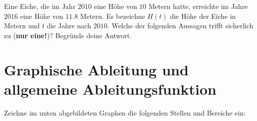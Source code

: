 \documentclass[11pt]{exam}
\begin{document}
\begin{questions}

\question[4] %
Eine Eiche, die im Jahr  $2010$ eine Höhe von $10$ Metern hatte, erreichte im Jahre $2016$ eine Höhe von $11.8$ Metern. Es bezeichne $H(t)$ die Höhe der Eiche in Metern und $t$ die Jahre nach $2010$. Welche der folgenden Aussagen trifft sicherlich zu (\textbf{nur eine!})? Begründe deine Antwort.

\newpage
\section{Graphische Ableitung und allgemeine Ableitungsfunktion}
\noaddpoints
\question[\totalpoints]
\addpoints
Zeichne im unten abgebildeten Graphen die folgenden Stellen und Bereiche ein:
\end{questions}
\end{document}
